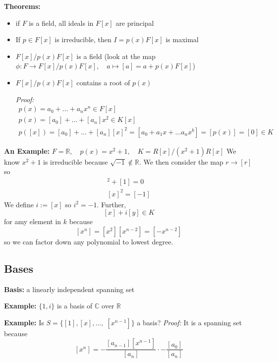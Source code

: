 \documentclass[12pt]{report}
\newcommand{\R}{\mathbb{R}}
\newcommand{\C}{\mathbb{C}}
\renewcommand{\indent}{\hspace*{0.5in}}
\begin{document}
        \textbf{Theorems:}
        \begin{itemize}
            \item if $F$ is a field, all ideals in $F[x]$ are principal 
            \item If $p \in F[x]$ is irreducible, then $I = p(x)F[x]$ is maximal 
            \item $F[x]/p(x)F[x]$ is a field (look at the map $\phi: F \to F[x]/p(x)F[x],\quad a\mapsto [a] = a + p(x)F[x]$)
            \item $F[x]/p(x)F[x]$ contains a root of $p(x)$
            
            \indent \emph{Proof:}
            \begin{gather*}
                p(x) = a_0 + \dots + a_nx^n \in F[x]\\
                p(x) = [a_0] + \dots + [a_n] x^2 \in K[x]\\
                p([x]) = [a_0] + \dots + [a_n][x]^2 = [a_0 + a_1x + \dots a_nx^b] = [p(x)] = [0] \in K
            \end{gather*}
        \end{itemize}

        \textbf{An Example:} $F= \R, \quad p(x) = x^2 + 1, \quad K = R[x]/(x^2 + 1)R[x]$
            We know $x^2 + 1$ is irreducible because $\sqrt{-1} \not \in \R$. We then consider the map $r \to [r]$ so 
            \begin{gather}
                [x]^2 + [1] = 0\\
                [x]^2 = [-1]
            \end{gather}
            We define $i := [x]$ so $i^2 = -1$. Further, 
            \[[x] + i[y] \in K\]
            for amy element in $k$ because 
            \[[x^n] = [x^2][x^{n-2}] = [-x^{n-2}]\]
            so we can factor down any polynomial to lowest degree.

    \subsection*{Bases}
        \textbf{Basis:} a linearly independent spanning set
        
        \textbf{Example:} $\{1, i\}$ is a basis of $\C$ over $\R$ 

        \textbf{Example:} Is $S = \{[1], [x], \dots,\; [x^{n-1}]\}$ a basis? 
        \indent \emph{Proof:} It is a spanning set because 
        \[[x^n] = -\frac{[a_{n-1}] [x^{n-1}]}{[a_n]} \cdot -\frac{[a_0]}{[a_n]}\]
\end{document}
